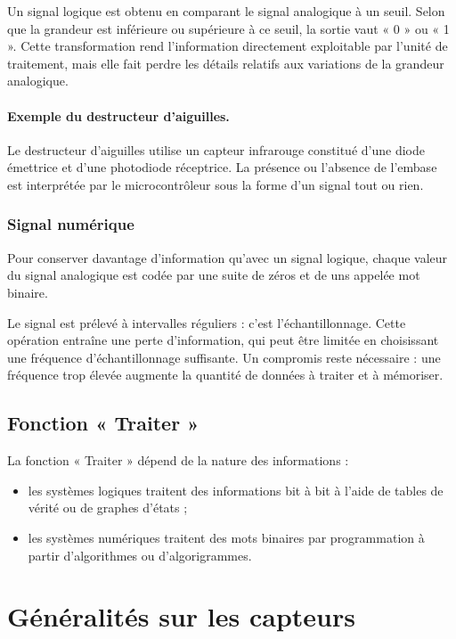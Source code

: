 Un signal logique est obtenu en comparant le signal analogique à un seuil. Selon que la grandeur est inférieure ou supérieure à ce seuil, la sortie vaut « 0 » ou « 1 ». Cette transformation rend l'information directement exploitable par l'unité de traitement, mais elle fait perdre les détails relatifs aux variations de la grandeur analogique.

\paragraph{Exemple du destructeur d'aiguilles.}
Le destructeur d'aiguilles utilise un capteur infrarouge constitué d'une diode émettrice et d'une photodiode réceptrice. La présence ou l'absence de l'embase est interprétée par le microcontrôleur sous la forme d'un signal tout ou rien.

\subsubsection{Signal numérique}

Pour conserver davantage d'information qu'avec un signal logique, chaque valeur du signal analogique est codée par une suite de zéros et de uns appelée mot binaire.

Le signal est prélevé à intervalles réguliers : c'est l'échantillonnage. Cette opération entraîne une perte d'information, qui peut être limitée en choisissant une fréquence d'échantillonnage suffisante. Un compromis reste nécessaire : une fréquence trop élevée augmente la quantité de données à traiter et à mémoriser.

\subsection{Fonction « Traiter »}

La fonction « Traiter » dépend de la nature des informations :
\begin{itemize}
  \item les systèmes logiques traitent des informations bit à bit à l'aide de tables de vérité ou de graphes d'états ;
  \item les systèmes numériques traitent des mots binaires par programmation à partir d'algorithmes ou d'algorigrammes.
\end{itemize}

\section{Généralités sur les capteurs}\label{sec:elec-capteurs}

